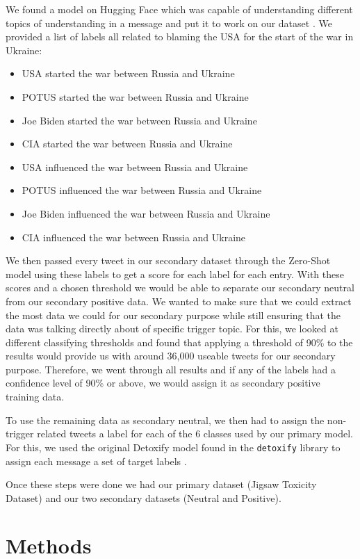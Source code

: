 We found a model on Hugging Face which was capable of understanding different topics of understanding in a message and put it to work on our dataset \cite{ZS}. We provided a list of labels all related to blaming the USA for the start of the war in Ukraine:
\begin{itemize}
    \setlength{\itemsep}{0pt}
    \item USA started the war between Russia and Ukraine
    \item POTUS started the war between Russia and Ukraine
    \item Joe Biden started the war between Russia and Ukraine
    \item CIA started the war between Russia and Ukraine
    \item USA influenced the war between Russia and Ukraine
    \item POTUS influenced the war between Russia and Ukraine
    \item Joe Biden influenced the war between Russia and Ukraine
    \item CIA influenced the war between Russia and Ukraine
\end{itemize}
We then passed every tweet in our secondary dataset through the Zero-Shot model using these labels to get a score for each label for each entry. With these scores and a chosen threshold we would be able to separate our secondary neutral from our secondary positive data. We wanted to make sure that we could extract the most data we could for our secondary purpose while still ensuring that the data was talking directly about of specific trigger topic. For this, we looked at different classifying thresholds and found that applying a threshold of 90\% to the results would provide us with around 36,000 useable tweets for our secondary purpose. Therefore, we went through all results and if any of the labels had a confidence level of 90\% or above, we would assign it as secondary positive training data.

To use the remaining data as secondary neutral, we then had to assign the non-trigger related tweets a label for each of the 6 classes used by our primary model. For this, we used the original Detoxify model found in the \verb|detoxify| library to assign each message a set of target labels \cite{Detoxify}. 

Once these steps were done we had our primary dataset (Jigsaw Toxicity Dataset) and our two secondary datasets (Neutral and Positive).

\section{Methods}


